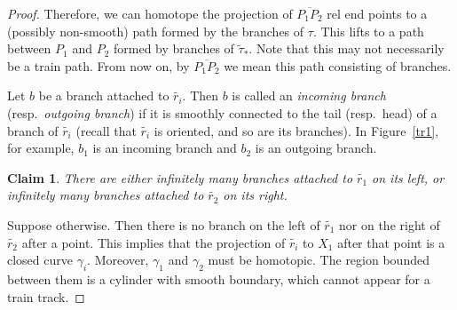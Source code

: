 \documentclass[11pt]{article} %
\theoremstyle{plain}
\newtheorem{clmA}{Claim}
\theoremstyle{definition}
\numberwithin{equation}{section}
\begin{document}
\begin{proof}
Therefore, we can homotope the projection of $\overline{P_1P_2}$ rel end points to a (possibly non-smooth) path formed by the branches of $\tau$. This lifts to a path between $P_1$ and $P_2$ formed by branches of $\widetilde{\tau}_*$. Note that this may not necessarily be a train path. From now on, by $\overline{P_1P_2}$ we mean this path consisting of branches.


Let $b$ be a branch attached to $\widetilde{r_i}$. Then $b$ is called an \emph{incoming branch} (resp.\ \emph{outgoing branch}) if it is smoothly connected to the tail (resp.\ head) of a branch of $\widetilde{r_i}$ (recall that $\widetilde{r_i}$ is oriented, and so are its branches). In Figure~\ref{tr1}, for example, $b_1$ is an incoming branch and $b_2$ is an outgoing branch. 

\begin{clmA} \label{inf}
There are either infinitely many branches attached to $\widetilde{r_1}$ on its left, or infinitely many branches attached to $\widetilde{r_2}$ on its right.
\end{clmA}
Suppose otherwise. Then there is no branch on the left of $\widetilde{r_1}$ nor on the right of $\widetilde{r_2}$ after a point. This implies that the projection of $\widetilde{r_i}$ to $X_1$ after that point is a closed curve $\gamma_i$. Moreover, $\gamma_1$ and $\gamma_2$ must be homotopic. The region bounded between them is a cylinder with smooth boundary, which cannot appear for a train track.



\end{proof}
\end{document}
